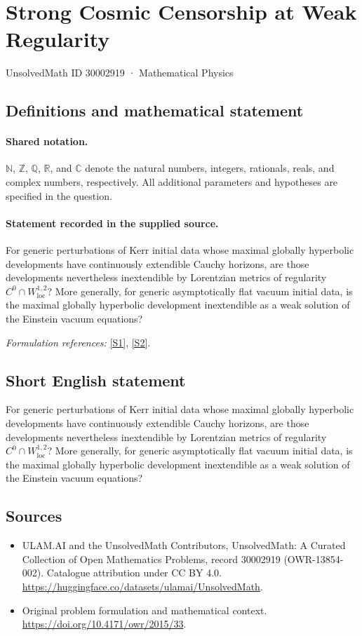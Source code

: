 \documentclass[11pt]{article}
\newcommand{\sref}[2]{\hyperlink{source:#1:#2}{[S#2]}}
\begin{document}
\setcounter{section}{30002918}
\section{Strong Cosmic Censorship at Weak Regularity}\label{30002919}
{\small UnsolvedMath ID 30002919 · Mathematical Physics}
\subsection{Definitions and mathematical statement}

\paragraph{Shared notation.}$\mathbb N$, $\mathbb Z$, $\mathbb Q$, $\mathbb R$, and $\mathbb C$ denote the natural numbers, integers, rationals, reals, and complex numbers, respectively. All additional parameters and hypotheses are specified in the question.


\paragraph{Statement recorded in the supplied source.}
For generic perturbations of Kerr initial data whose maximal globally hyperbolic developments have continuously extendible Cauchy horizons, are those developments nevertheless inextendible by Lorentzian metrics of regularity $C^0\cap W_{\mathrm{loc}}^{1,2}$? More generally, for generic asymptotically flat vacuum initial data, is the maximal globally hyperbolic development inextendible as a weak solution of the Einstein vacuum equations?
\par\smallskip\textit{Formulation references:} \sref{30002919}{1}, \sref{30002919}{2}.
\subsection{Short English statement}
For generic perturbations of Kerr initial data whose maximal globally hyperbolic developments have continuously extendible Cauchy horizons, are those developments nevertheless inextendible by Lorentzian metrics of regularity $C^0\cap W_{\mathrm{loc}}^{1,2}$? More generally, for generic asymptotically flat vacuum initial data, is the maximal globally hyperbolic development inextendible as a weak solution of the Einstein vacuum equations?
\subsection{Sources}
\begin{itemize}
\item[\hypertarget{source:30002919:1}{S1}] ULAM.AI and the UnsolvedMath Contributors, UnsolvedMath: A Curated Collection of Open Mathematics Problems, record 30002919 (OWR-13854-002). Catalogue attribution under CC BY 4.0.
\url{https://huggingface.co/datasets/ulamai/UnsolvedMath}.
\item[\hypertarget{source:30002919:2}{S2}] Original problem formulation and mathematical context.
\url{https://doi.org/10.4171/owr/2015/33}.
\end{itemize}
\label{end:30002919}
\end{document}
